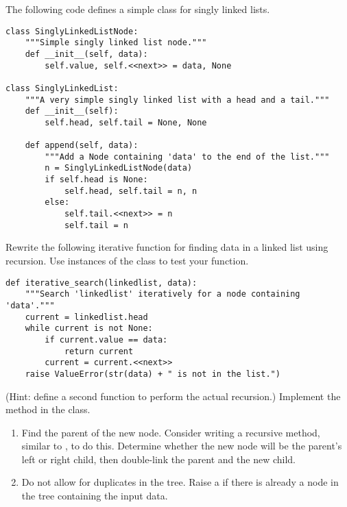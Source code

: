 The following code defines a simple class for singly linked lists.
\begin{lstlisting}
class SinglyLinkedListNode:
    """Simple singly linked list node."""
    def __init__(self, data):
        self.value, self.<<next>> = data, None

class SinglyLinkedList:
    """A very simple singly linked list with a head and a tail."""
    def __init__(self):
        self.head, self.tail = None, None

    def append(self, data):
        """Add a Node containing 'data' to the end of the list."""
        n = SinglyLinkedListNode(data)
        if self.head is None:
            self.head, self.tail = n, n
        else:
            self.tail.<<next>> = n
            self.tail = n
\end{lstlisting}
Rewrite the following iterative function for finding data in a linked list using recursion.
Use instances of the  class to test your function.
\begin{lstlisting}
def iterative_search(linkedlist, data):
    """Search 'linkedlist' iteratively for a node containing 'data'."""
	current = linkedlist.head
	while current is not None:
		if current.value == data:
			return current
		current = current.<<next>>
	raise ValueError(str(data) + " is not in the list.")
\end{lstlisting}
(Hint: define a second function to perform the actual recursion.)
\label{prob:recursion}
Implement the  method in the  class.
%
\begin{enumerate}
\item Find the parent of the new node.
Consider writing a recursive method, similar to , to do this.
Determine whether the new node will be the parent's left or right child, then double-link the parent and the new child.
\item Do not allow for duplicates in the tree. Raise a  if there is already a node in the tree containing the input data.
\end{enumerate}


